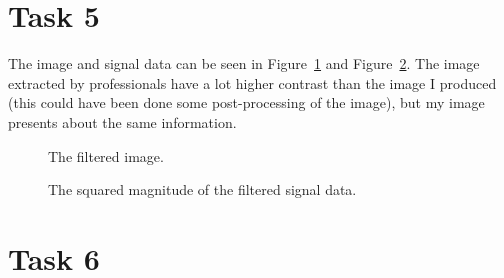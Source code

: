 \documentclass[12pt,a4paper]{article}
\begin{document}
\section{Task 5}
The image and signal data can be seen in Figure~\ref{fig:task5_img} and Figure~\ref{fig:task5_sig}. The image extracted by professionals have a lot higher contrast than the image I produced (this could have been done some post-processing of the image), but my image presents about the same information.
\begin{figure}[ht!]
  \centering
  \noindent{}
  \caption{The filtered image.}
  \label{fig:task5_img}
\end{figure}
\begin{figure}[ht!]
  \centering
  \noindent\makebox[\textwidth]{\scalebox{0.90}{}}
  \caption{The squared magnitude of the filtered signal data.}
  \label{fig:task5_sig}
\end{figure}

\section{Task 6}
\end{document}
